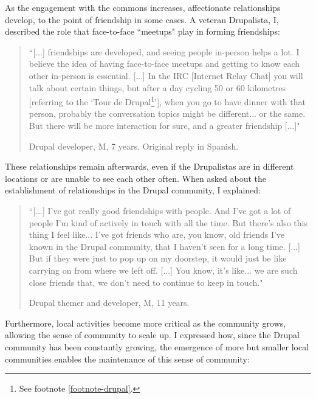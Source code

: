 As the engagement with the commons increases, affectionate relationships develop, to the point of friendship in some cases. A veteran Drupalista, I, described the role that face-to-face ``meetups" play in forming friendships:

\begin{quotation}
    ``[...] friendships are developed, and seeing people in-person helps a lot. I believe the idea of having face-to-face meetups and getting to know each other in-person is essential. [...] In the IRC [Internet Relay Chat] you will talk about certain things, but after a day cycling 50 or 60 kilometres [referring to the `Tour de Drupal\footnote{See footnote \ref{footnote-drupal}.}'], when you go to have dinner with that person, probably the conversation topics might be different... or the same. But there will be more interaction for sure, and a greater friendship [...]"

\begin{flushright}\footnotesize{Drupal developer, M, 7 years. Original reply in Spanish.}\end{flushright}
\end{quotation}

These relationships remain afterwards, even if the Drupalistas are in different locations or are unable to see each other often. When asked about the establishment of relationships in the Drupal community, I explained:

\begin{quotation}
    ``[...] I've got really good friendships with people. And I've got a lot of people I'm kind of actively in touch with all the time. But there's also this thing I feel like... I've got friends who are, you know, old friends I've known in the Drupal community, that I haven't seen for a long time. [...] But if they were just to pop up on my doorstep, it would just be like carrying on from where we left off. [...] You know, it's like... we are such close friends that, we don't need to continue to keep in touch."

\begin{flushright}\footnotesize{Drupal themer and developer, M, 11 years.}\end{flushright}
\end{quotation}

Furthermore, local activities become more critical as the community grows, allowing the sense of community to scale up. I expressed how, since the Drupal community has been constantly growing, the emergence of more but smaller local communities enables the maintenance of this sense of community:

